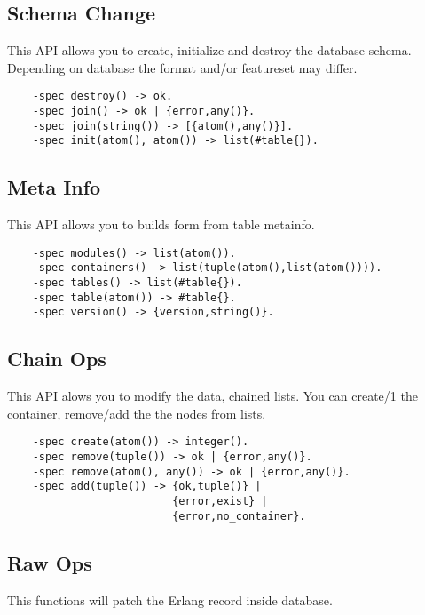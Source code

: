 \subsection{Schema Change}
This API allows you to create, initialize and destroy the database schema.
Depending on database the format and/or featureset may differ.

\vspace{1\baselineskip}
\begin{lstlisting}
    -spec destroy() -> ok.
    -spec join() -> ok | {error,any()}.
    -spec join(string()) -> [{atom(),any()}].
    -spec init(atom(), atom()) -> list(#table{}).
\end{lstlisting}
\vspace{1\baselineskip}

\subsection{Meta Info}
This API allows you to builds form from table metainfo.

\vspace{1\baselineskip}
\begin{lstlisting}
    -spec modules() -> list(atom()).
    -spec containers() -> list(tuple(atom(),list(atom()))).
    -spec tables() -> list(#table{}).
    -spec table(atom()) -> #table{}.
    -spec version() -> {version,string()}.
\end{lstlisting}
\vspace{1\baselineskip}

\subsection{Chain Ops}
This API alows you to modify the data, chained lists.
You can create/1 the container, remove/add the the nodes from lists.

\vspace{1\baselineskip}
\begin{lstlisting}
    -spec create(atom()) -> integer().
    -spec remove(tuple()) -> ok | {error,any()}.
    -spec remove(atom(), any()) -> ok | {error,any()}.
    -spec add(tuple()) -> {ok,tuple()} | 
                          {error,exist} | 
                          {error,no_container}.
\end{lstlisting}
\vspace{1\baselineskip}


\subsection{Raw Ops}
This functions will patch the Erlang record inside database.

